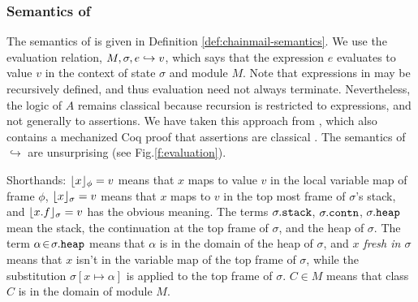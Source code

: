 \subsubsection{Semantics of \SpecO}
The semantics of \SpecO   
is given in Definition \ref{def:chainmail-semantics}. 
We   use the evaluation relation, $M, \sigma, e \hookrightarrow v$,
which says that the expression $e$ evaluates
to value $v$ in the context of state $\sigma$ and module $M$.
Note that expressions in \Loo may be recursively defined, and thus evaluation 
need not always %
 terminate. Nevertheless, the logic of $A$ remains classical because recursion is restricted
to expressions, and not generally to assertions.
We have taken this approach from , which also contains a mechanized Coq proof that assertions are classical \cite{coqFASE}.
The semantics of $\hookrightarrow$ are unsurprising (see Fig.\ref{f:evaluation}).

Shorthands: 
 $\lfloor x \rfloor_{\phi} = v$  means that $x$ maps to
value $v$ in the local variable map of frame $\phi$, $\lfloor x \rfloor_{\sigma} = v$ means that $x$ 
maps to $v$ in the top most frame of $\sigma$'s stack, and $\lfloor x.f \rfloor_{\sigma} = v$
has the obvious meaning. The terms $\sigma.{\texttt{stack}}$,  
$\sigma.{\texttt{contn}}$, 
$\sigma.{\texttt{heap}}$     mean the stack, 
the continuation at the
top frame of $\sigma$, %
and the heap of $\sigma$.
The term $\alpha\!\in\!\sigma.{\texttt{heap}}$ means that $\alpha$ is in the domain of the heap of $\sigma$, and \emph{$x$ fresh in $\sigma$} means that 
$x$ isn't in the variable map of the top frame of $\sigma$, 
while the substitution  $\sigma[x \mapsto \alpha]$ is applied to the top frame of $\sigma$.
$C\in M$ means that class $C$ is in the domain of module $M$. 

